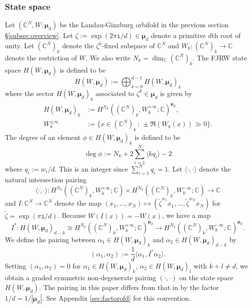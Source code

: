 \documentclass[11pt]{amsart}
\theoremstyle{definition} %
\theoremstyle{remark} %
\newcommand{\CC}{\mathbb C}
\def\pair#1#2{\langle #1, #2\rangle}
\newcommand{\look}[1]{\marginpar{\bf \tiny #1}}
\newcommand{\bmu}{\boldsymbol{\mu}}
\newcommand{\iu}{\mathtt{i}}
\begin{document}
\subsubsection{State space}
\label{subsubsec:FJRW-statespace} 
Let $(\CC^N, W,\bmu_d)$ be the Landau-Ginzburg orbifold 
in the previous section \S \ref{subsec:overview}. 
Let $\zeta := \exp(2\pi\iu/d)\in \bmu_d$ denote 
a primitive $d$th root of unity.  
Let $(\CC^N)_k$ denote the $\zeta^k$-fixed 
subspace of $\CC^N$ 
and $W_k \colon (\CC^N)_k \to \CC$ denote 
the restriction of $W$. 
We also write $N_k = \dim_\CC (\CC^N)_k$. 
The FJRW state space $H(W,\bmu_d)$ is defined to be 
\[
H(W,\bmu_d) := 
\bigoplus_{k=0}^{d-1} H(W,\bmu_d)_k   
\]
where the sector $H(W,\bmu_d)_k$ associated to 
$\zeta^k \in \bmu_d$ is given by 
\begin{align*} 
H(W,\bmu_d)_k &:= H^{N_k} 
\left((\CC^N)_k, W_k^{+\infty};\CC 
\right)^{\bmu_d},  
\\
W_k^{\pm \infty} &:= \{ x \in (\CC^N)_k \,:\, 
\pm \Re(W_k(x)) \gg 0\}.  
\end{align*} 
The degree of an element $\phi\in H(W,\bmu_d)_k$ is 
defined to be 
\begin{equation} 
\label{eq:deg-FJRW} 
\deg \phi := N_k + 
2\sum_{i=1}^N \langle k q_i \rangle  -2 
\end{equation} 
where $q_i := w_i/d$. This is an integer since $\sum_{i=1}^N q_i =1$. 
Let $\pair{\cdot}{\cdot}$ denote the 
natural intersection pairing 
\begin{equation} 
\label{eq:intersection-pairing} 
\pair{\cdot}{\cdot} \colon 
H^{N_k}\left((\CC^N)_k, W_k^{+\infty};\CC\right)
\times 
H^{N_k}\left((\CC^N)_k, W_k^{-\infty};\CC\right) 
\to \CC 
\end{equation} 
and $I\colon \CC^N \to \CC^N$ denote the map 
$(x_1,\dots, x_N) \mapsto (\tilde\zeta^{w_1} x_1,\dots, 
\tilde\zeta^{w_N} x_N)$ for $\tilde\zeta = \exp(\pi\iu/d)$. 
Because $W(I(x)) = - W(x)$, we have a map 
\begin{equation} 
\label{eq:Istar} 
I^* \colon H(W,\bmu_d)_{d-k} \cong 
H^{N_k}\left((\CC^N)_k, W_k^{+\infty};\CC\right)^{\bmu_d}
\to 
H^{N_k}\left((\CC^N)_k, W_k^{-\infty};\CC\right)^{\bmu_d}.   
\end{equation} 
We define the pairing between $\alpha_1 \in H(W,\bmu_d)_k$ and 
$\alpha_2 \in H(W,\bmu_d)_{d-k}$ by 
\begin{equation} 
\label{eq:FJRW-pairing}
(\alpha_1,\alpha_2) := \frac{1}{d} 
\pair{\alpha_1}{I^* \alpha_2}. 
\end{equation} 
Setting $(\alpha_1,\alpha_2)=0$ for 
$\alpha_1\in H(W,\bmu_d)_k$, $\alpha_2 \in H(W,\bmu_d)_l$ with 
$k+l \neq d$, we obtain a graded symmetric 
non-degenerate pairing $(\cdot,\cdot)$ on the 
state space $H(W,\bmu_d)$. 
The pairing in this paper differs from that in 
\cite{FJR1} by the factor $1/d = 1/|\bmu_d|$. 
See Appendix \ref{sec:factorofd} for this convention. 
\end{document}
